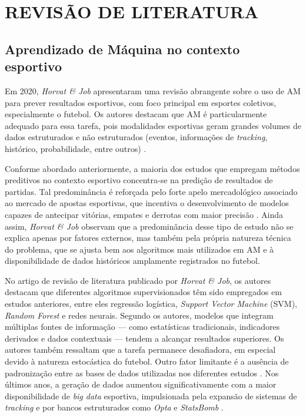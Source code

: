 %
\chapter{REVISÃO DE LITERATURA}

\section{Aprendizado de Máquina no contexto esportivo}

Em 2020, \textit{Horvat & Job} apresentaram uma revisão abrangente sobre o uso de AM para prever resultados esportivos, com foco principal em esportes coletivos, 
especialmente o futebol. Os autores destacam que AM é particularmente adequado para essa tarefa, pois modalidades esportivas geram grandes volumes de dados estruturados 
e não estruturados (eventos, informações de \textit{tracking}, histórico, probabilidade, entre outros) \cite{Horvat2020}.

Conforme abordado anteriormente, a maioria dos estudos que empregam métodos preditivos no contexto esportivo concentra-se na predição de resultados de partidas. 
Tal predominância é reforçada pelo forte apelo mercadológico associado ao mercado de apostas esportivas, que incentiva o desenvolvimento de modelos capazes de 
antecipar vitórias, empates e derrotas com maior precisão \cite{Abidin2021}. Ainda assim, \textit{Horvat & Job} observam que a predominância desse tipo de estudo 
não se explica apenas por fatores externos, mas também pela própria natureza técnica do problema, que se ajusta bem aos algoritmos mais utilizados em AM e 
à disponibilidade de dados históricos amplamente registrados no futebol.

No artigo de revisão de literatura publicado por \textit{Horvat & Job}, os autores destacam que diferentes algoritmos supervisionados têm sido empregados em
estudos anteriores, entre eles regressão logística, \textit{Support Vector Machine} (SVM), \textit{Random Forest} e redes neurais. Segundo os autores, 
modelos que integram múltiplas fontes de informação — como estatísticas tradicionais, indicadores derivados e dados contextuais — tendem a alcançar resultados superiores. 
Os autores também ressaltam que a tarefa permanece desafiadora, em especial devido à natureza estocástica do futebol. Outro fator limitante é a ausência de 
padronização entre as bases de dados utilizadas nos diferentes estudos \cite{Horvat2020}. Nos últimos anos, a geração de dados aumentou significativamente 
com a maior disponibilidade de \textit{big data} esportiva, impulsionada pela expansão de sistemas de \textit{tracking} e por bancos estruturados como \textit{Opta} 
e \textit{StatsBomb} \cite{Horvat2020}.

